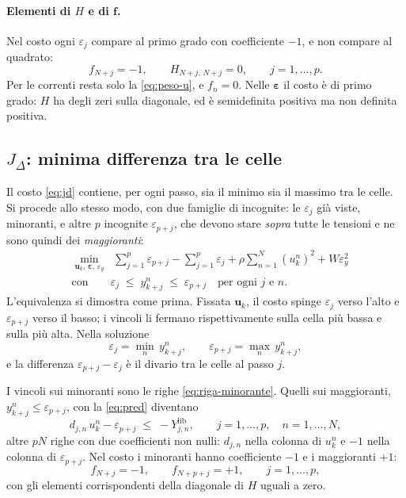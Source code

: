 \documentclass[11pt,a4paper]{article}
\newcommand{\vett}[1]{\boldsymbol{#1}}      %
\newcommand{\lib}{\mathrm{lib}}             %
\begin{document}
\paragraph{Elementi di $H$ e di $\vett{f}$.} Nel costo ogni $\varepsilon_j$ compare
al primo grado con coefficiente $-1$, e non compare al quadrato:
\begin{equation}
  f_{N+j} = -1 , \qquad H_{N+j,\,N+j} = 0 , \qquad j = 1,\dots,p .
  \label{eq:jm-hf}
\end{equation}
Per le correnti resta solo la \eqref{eq:peso-u}, e $f_n = 0$. Nelle
$\vett{\varepsilon}$ il costo è di primo grado: $H$ ha degli zeri sulla diagonale, ed
è semidefinita positiva ma non definita positiva.

\subsection{$J_\Delta$: minima differenza tra le celle}\label{sec:jd}

Il costo \eqref{eq:jd} contiene, per ogni passo, sia il minimo sia il massimo
tra le celle. Si procede allo stesso modo, con due famiglie di incognite: le
$\varepsilon_j$ già viste, minoranti, e altre $p$ incognite
$\varepsilon_{p+j}$, che devono stare \emph{sopra} tutte le tensioni e ne sono
quindi dei \emph{maggioranti}:
\begin{equation}
\begin{aligned}
  & \min_{\vett{u}_k,\,\vett{\varepsilon},\,\varepsilon_y} \;\;
     \sum_{j=1}^{p} \varepsilon_{p+j} - \sum_{j=1}^{p} \varepsilon_j
     + \rho \sum_{n=1}^{N} (u^n_k)^2 + W \varepsilon_y^2 \\[4pt]
  & \text{con} \qquad
  \varepsilon_j \;\le\; y^n_{k+j} \;\le\; \varepsilon_{p+j}
  \quad \text{per ogni } j \text{ e } n .
\end{aligned}
\label{eq:jd-eps}
\end{equation}
L'equivalenza si dimostra come prima. Fissata $\vett{u}_k$, il costo spinge
$\varepsilon_j$ verso l'alto e $\varepsilon_{p+j}$ verso il basso; i vincoli li
fermano rispettivamente sulla cella più bassa e sulla più alta. Nella soluzione
\[
  \varepsilon_j = \min_{n}\, y^n_{k+j} , \qquad
  \varepsilon_{p+j} = \max_{n}\, y^n_{k+j} ,
\]
e la differenza $\varepsilon_{p+j} - \varepsilon_j$ è il divario tra le celle
al passo $j$.

I vincoli sui minoranti sono le righe \eqref{eq:riga-minorante}. Quelli sui
maggioranti, $y^n_{k+j} \le \varepsilon_{p+j}$, con la \eqref{eq:pred}
diventano
\begin{equation}
  d_{j,n}\,u^n_k - \varepsilon_{p+j} \;\le\; -Y^\lib_{j,n} ,
  \qquad j = 1,\dots,p , \quad n = 1,\dots,N ,
  \label{eq:riga-maggiorante}
\end{equation}
altre $pN$ righe con due coefficienti non nulli: $d_{j,n}$ nella colonna di
$u^n_k$ e $-1$ nella colonna di $\varepsilon_{p+j}$. Nel costo i minoranti hanno
coefficiente $-1$ e i maggioranti $+1$:
\begin{equation}
  f_{N+j} = -1 , \qquad f_{N+p+j} = +1 , \qquad j = 1,\dots,p ,
  \label{eq:jd-hf}
\end{equation}
con gli elementi corrispondenti della diagonale di $H$ uguali a zero.
\end{document}
